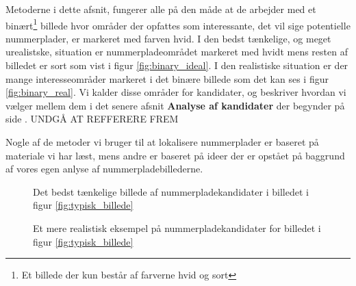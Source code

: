 Metoderne i dette afsnit, fungerer alle på den måde at de arbejder med et binært\footnote{Et billede der kun består af farverne hvid og sort} billede hvor områder der opfattes som interessante, det vil sige potentielle nummerplader, er markeret med farven hvid. I den bedst tænkelige, og meget urealistske, situation er nummerpladeområdet markeret med hvidt mens resten af billedet er sort som vist i figur \vref{fig:binary_ideal}. I den realistiske situation er der mange interesseområder markeret i det binære billede som det kan ses i figur \vref{fig:binary_real}. Vi kalder disse områder for kandidater, og beskriver hvordan vi vælger mellem dem i det senere afsnit \textbf{Analyse af kandidater} der begynder på side \pageref{sec:BinImgCleanup}. UNDGÅ AT REFFERERE FREM 

Nogle af de metoder vi bruger til at lokalisere nummerplader er baseret på materiale vi har læst, mens andre er baseret på ideer der er opstået på baggrund af vores egen anlyse af nummerpladebillederne.


\begin{figure}[htbp]
  \centering
  \begin{minipage}[b]{5 cm}
    \caption{Det bedst tænkelige billede af nummerpladekandidater i billedet i figur \ref{fig:typisk_billede}}
    \label{fig:binary_ideal} 
  \end{minipage}
  \begin{minipage}[b]{5 cm}
  \caption{Et mere realistisk eksempel på nummerpladekandidater for billedet i figur \ref{fig:typisk_billede}}
  \label{fig:binary_real} 
  \end{minipage}
\end{figure}


